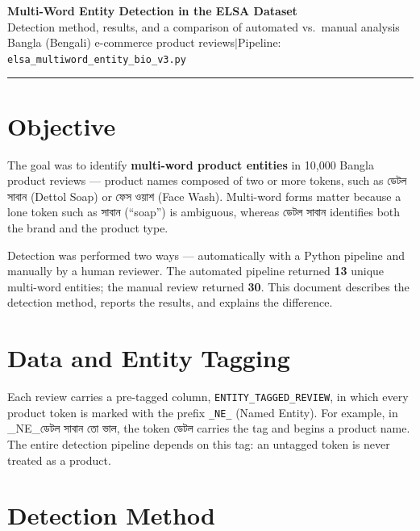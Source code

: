 \documentclass[11pt]{article}
\newcommand{\bn}[1]{{\bnfont #1}}
\begin{document}
\begin{center}
  {\LARGE\bfseries\color{brandblue} Multi-Word Entity Detection in the ELSA Dataset}\\[4pt]
  {\normalsize Detection method, results, and a comparison of automated vs.\ manual analysis}\\[3pt]
  {\small Bangla (Bengali) e-commerce product reviews\quad$\vert$\quad Pipeline: \texttt{elsa\_multiword\_entity\_bio\_v3.py}}\\[6pt]
  \rule{\textwidth}{0.8pt}
\end{center}

\section{Objective}

The goal was to identify \textbf{multi-word product entities} in 10,000 Bangla
product reviews --- product names composed of two or more tokens, such as
\bn{ডেটল সাবান} (Dettol Soap) or \bn{ফেস ওয়াশ} (Face Wash). Multi-word forms
matter because a lone token such as \bn{সাবান} (``soap'') is ambiguous, whereas
\bn{ডেটল সাবান} identifies both the brand and the product type.

Detection was performed two ways --- automatically with a Python pipeline and
manually by a human reviewer. The automated pipeline returned \textbf{13} unique
multi-word entities; the manual review returned \textbf{30}. This document
describes the detection method, reports the results, and explains the
difference.

\section{Data and Entity Tagging}

Each review carries a pre-tagged column, \texttt{ENTITY\_TAGGED\_REVIEW}, in
which every product token is marked with the prefix \texttt{\_NE\_} (Named
Entity). For example, in \bn{\_NE\_ডেটল} \bn{সাবান} \bn{তো} \bn{ভাল}, the token
\bn{ডেটল} carries the tag and begins a product name. The entire detection
pipeline depends on this tag: an untagged token is never treated as a product.

\section{Detection Method}
\end{document}
